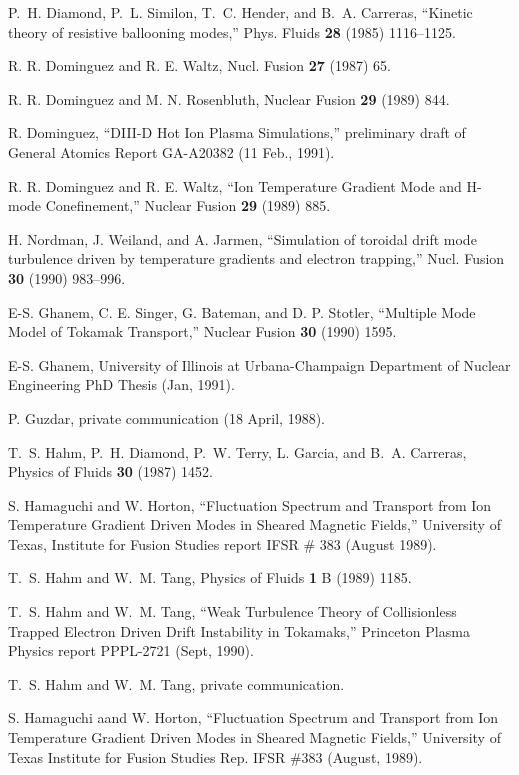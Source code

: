 \begin{thebibliography}{99}
 P.~H. Diamond, P.~L. Similon, T.~C. Hender, and
B.~A. Carreras, ``Kinetic theory of resistive ballooning modes,''
Phys. Fluids {\bf 28} (1985) 1116--1125.

 R. R. Dominguez and R. E. Waltz,
Nucl. Fusion {\bf 27} (1987) 65.

 R. R. Dominguez and M. N. Rosenbluth,
Nuclear Fusion {\bf 29} (1989) 844.

 R. Dominguez, ``DIII-D Hot Ion Plasma
Simulations,'' preliminary draft of General
Atomics Report GA-A20382 (11 Feb., 1991).

 R. R. Dominguez and R. E. Waltz, ``Ion Temperature
Gradient Mode and H-mode Conefinement,'' Nuclear Fusion
{\bf 29} (1989) 885.

 H. Nordman, J. Weiland, and A. Jarmen, 
``Simulation of toroidal drift mode turbulence driven by 
temperature gradients and electron trapping,'' 
Nucl. Fusion {\bf 30} (1990) 983--996.
 
 E-S. Ghanem, C. E. Singer, G. Bateman, and D.
P. Stotler, ``Multiple Mode Model of Tokamak Transport,''
Nuclear Fusion {\bf 30} (1990) 1595.

 E-S. Ghanem, University of Illinois at
Urbana-Champaign Department of Nuclear Engineering
PhD Thesis (Jan, 1991).

 P. Guzdar, private communication (18 April, 1988).

 T.~S. Hahm, P.~H. Diamond, P.~W. Terry, L. Garcia,
and B.~A. Carreras, Physics of Fluids {\bf 30} (1987) 1452.

 S. Hamaguchi and W. Horton,
``Fluctuation Spectrum and Transport from Ion Temperature Gradient Driven
Modes in Sheared Magnetic Fields,''
University of Texas, Institute for Fusion Studies report
IFSR \# 383 (August 1989).

 T.~S. Hahm and W.~M. Tang,
Physics of Fluids {\bf 1} B (1989) 1185.

T.~S. Hahm and W.~M. Tang,
``Weak Turbulence Theory of Collisionless Trapped Electron Driven
Drift Instability in Tokamaks,''
Princeton Plasma Physics report PPPL-2721 (Sept, 1990).

T.~S. Hahm and W.~M. Tang, private communication.

 S. Hamaguchi aand W. Horton, ``Fluctuation
Spectrum and Transport from Ion Temperature Gradient
Driven Modes in Sheared Magnetic Fields,'' University of Texas
Institute for Fusion Studies Rep. IFSR \#383 (August, 1989).


\end{thebibliography}
